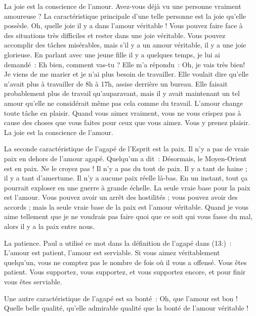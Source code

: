 La joie est la conscience de l'amour.
 Avez-vous déjà vu une \linebreak
 personne vraiment amoureuse ?
 La caractéristique principale d'une telle personne est la joie
 qu'elle possède. Oh, quelle joie il y a dans l'amour véritable !
 Vous pouvez faire face à des situations très difficiles
 et rester dans une joie véritable. Vous pouvez accomplir
 des tâches misérables, mais s'il y a un amour véritable,
 il y a une joie glorieuse. En parlant avec une jeune fille
 il y a quelques temps, je lui ai demandé~:
 \og Eh bien, comment vas-tu ? \fg{} Elle m'a répondu~:
 \og Oh, je vais très bien! Je viens de me marier et je n'ai plus besoin
 de travailler. \fg{}
 Elle voulait dire qu'elle n'avait plus à travailler de 8h à 17h,
 assise derrière un bureau. Elle faisait probablement plus de travail
 qu'auparavant, mais il y avait maintenant un tel amour
 qu'elle ne considérait même pas cela comme du travail.
 L'amour change toute tâche en plaisir. Quand vous aimez vraiment,
 vous ne vous crispez pas à cause des choses que vous faites
 pour ceux que vous aimez. Vous y prenez plaisir.
 La joie est la conscience de l'amour.

La seconde caractéristique de l'agapé de l'Esprit est la paix.
 Il n'y a pas de vraie paix en dehors de l'amour agapé.
 Quelqu'un a dit~: \og Désormais, le Moyen-Orient est en paix. \fg{}
 Ne le croyez pas ! Il n'y a pas du tout de paix.
 Il y a tant de haine ; il y a tant d'amertume.
 Il n'y a aucune paix réelle là-bas. En un instant, tout ça pourrait
 exploser en une guerre à grande échelle.
 La seule vraie base pour la paix est l'amour.
 Vous pouvez avoir un arrêt des hostilités ; vous pouvez avoir des accords ;
 mais la seule vraie base de la paix est l'amour véritable.
 Quand je vous aime tellement que je ne voudrais pas faire
 quoi que ce soit qui vous fasse du mal, alors il y a la paix entre nous.

\begin{specialpar}{}
La patience. Paul a utilisé ce mot dans la définition de l'agapé
 dans (13:)~:
 \og L'amour est patient, l'amour est serviable. \fg{}
 Si vous aimez véritablement quelqu'un, vous ne comptez pas
 le nombre de fois où il vous a offensé. Vous êtes patient.
 Vous supportez, vous supportez, et vous supportez encore,
 et pour finir vous êtes serviable.
\end{specialpar}

Une autre caractéristique de l'agapé est sa bonté~:
 Oh, que l'amour est bon ! Quelle belle qualité,
 qu'elle admirable qualité que la bonté de l'amour véritable !

